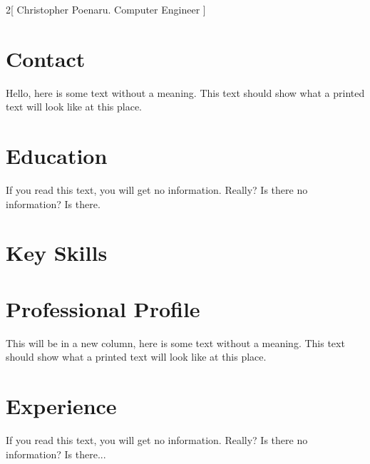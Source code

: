 \documentclass{article}
\begin{document}
\begin{multicols}{2}[
  Christopher Poenaru.
  Computer Engineer
  ]

\section*{Contact}

Hello, here is some text without a meaning.  This text should show what
a printed text will look like at this place.

\section*{Education}

If you read this text, you will get no information.  Really?  Is there
no information?  Is there.

\section*{Key Skills}

\columnbreak

\section*{Professional Profile}

This will be in a new column, here is some text without a meaning.  This text
should show what a printed text will look like at this place.

\section*{Experience}

If you read this text, you will get no information.  Really?  Is there
no information?  Is there...
\end{multicols}


\end{document}
